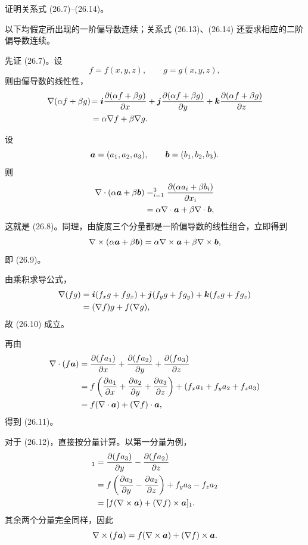 \begin{xexercise}[1]
证明关系式 (26.7)--(26.14)。
\end{xexercise}
\begin{xsolution}
以下均假定所出现的一阶偏导数连续；关系式 (26.13)、(26.14) 还要求相应的二阶偏导数连续。

先证 (26.7)。设
\[
  f=f(x,y,z),\qquad g=g(x,y,z),
\]
则由偏导数的线性性，
\begin{align*}
  \nabla(\alpha f+\beta g)
  &\!=\bm{i}\frac{\partial(\alpha f+\beta g)}{\partial x}
   +\bm{j}\frac{\partial(\alpha f+\beta g)}{\partial y}
   +\bm{k}\frac{\partial(\alpha f+\beta g)}{\partial z}\\
  &=\alpha\nabla f+\beta\nabla g.
\end{align*}

设
\[
  \bm{a}=(a_1,a_2,a_3),\qquad \bm{b}=(b_1,b_2,b_3).
\]
则
\begin{align*}
  \nabla\cdot(\alpha\bm{a}+\beta\bm{b})
  &=\relax_{i=1}^3\frac{\partial(\alpha a_i+\beta b_i)}{\partial x_i}\\
  &=\alpha\nabla\cdot\bm{a}+\beta\nabla\cdot\bm{b},
\end{align*}
这就是 (26.8)。同理，由旋度三个分量都是一阶偏导数的线性组合，立即得到
\[
  \nabla\times(\alpha\bm{a}+\beta\bm{b})
  =\alpha\nabla\times\bm{a}+\beta\nabla\times\bm{b},
\]
即 (26.9)。

由乘积求导公式，
\begin{align*}
  \nabla(fg)
  &=\bm{i}(f_xg+fg_x)+\bm{j}(f_yg+fg_y)+\bm{k}(f_zg+fg_z)\\
  &=(\nabla f)g+f(\nabla g),
\end{align*}
故 (26.10) 成立。

再由
\begin{align*}
  \nabla\cdot(f\bm{a})
  &=\frac{\partial(fa_1)}{\partial x}
   +\frac{\partial(fa_2)}{\partial y}
   +\frac{\partial(fa_3)}{\partial z}\\
  &=f\left(\frac{\partial a_1}{\partial x}
   +\frac{\partial a_2}{\partial y}
   +\frac{\partial a_3}{\partial z}\right)
   +\left(f_xa_1+f_ya_2+f_za_3\right)\\
  &=f(\nabla\cdot\bm{a})+(\nabla f)\cdot\bm{a},
\end{align*}
得到 (26.11)。

对于 (26.12)，直接按分量计算。以第一分量为例，
\begin{align*}
  [\nabla\times(f\vect{a})]_1
  &=\frac{\partial(fa_3)}{\partial y}-\frac{\partial(fa_2)}{\partial z}\\
  &=f\left(\frac{\partial a_3}{\partial y}-\frac{\partial a_2}{\partial z}\right)
   +f_ya_3-f_za_2\\
  &=[f(\nabla\times\vect{a})+(\nabla f)\times\vect{a}]_1.
\end{align*}
其余两个分量完全同样，因此
\[
  \nabla\times(f\bm{a})
  =f(\nabla\times\bm{a})+(\nabla f)\times\bm{a}.
\]


\end{xsolution}
